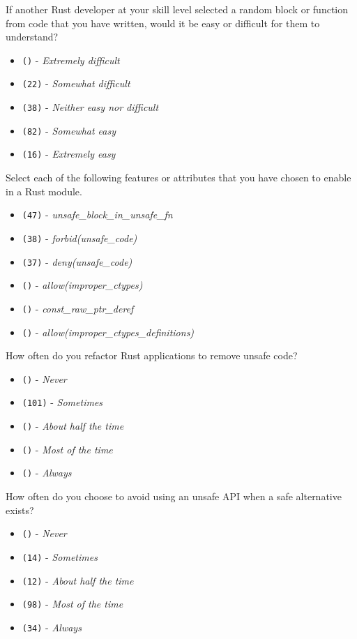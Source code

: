 \begin{protocol}
\item \label{survey:lmuq1}  If another Rust developer at your skill level selected a random \unsafe block or function from code that you have written, would it be easy or difficult for them to understand?
\begin{itemize}
\item \texttt{()} - \textit{Extremely difficult}
\item \texttt{(22)} - \textit{Somewhat difficult}
\item \texttt{(38)} - \textit{Neither easy nor difficult}
\item \texttt{(82)} - \textit{Somewhat easy}
\item \texttt{(16)} - \textit{Extremely easy}
\end{itemize}
\item \label{survey:lmuq2}  Select each of the following features or attributes  that you have chosen to enable in a Rust module.
\begin{itemize}
\item \texttt{(47)} - \textit{unsafe\_block\_in\_unsafe\_fn}
\item \texttt{(38)} - \textit{forbid(unsafe\_code)}
\item \texttt{(37)} - \textit{deny(unsafe\_code)}
\item \texttt{()} - \textit{allow(improper\_ctypes)}
\item \texttt{()} - \textit{const\_raw\_ptr\_deref}
\item \texttt{()} - \textit{allow(improper\_ctypes\_definitions)}
\end{itemize}
\item \label{survey:lmuq3}  How often do you refactor Rust applications to remove unsafe code?
\begin{itemize}
\item \texttt{()} - \textit{Never}
\item \texttt{(101)} - \textit{Sometimes}
\item \texttt{()} - \textit{About half the time}
\item \texttt{(\space {})} - \textit{Most of the time}
\item \texttt{(\space {})} - \textit{Always}
\end{itemize}
\item \label{survey:lmuq4}  How often do you choose to avoid using an unsafe API when a safe alternative exists?
\begin{itemize}
\item \texttt{()} - \textit{Never}
\item \texttt{(14)} - \textit{Sometimes}
\item \texttt{(12)} - \textit{About half the time}
\item \texttt{(98)} - \textit{Most of the time}
\item \texttt{(34)} - \textit{Always}
\end{itemize}
\end{protocol}

